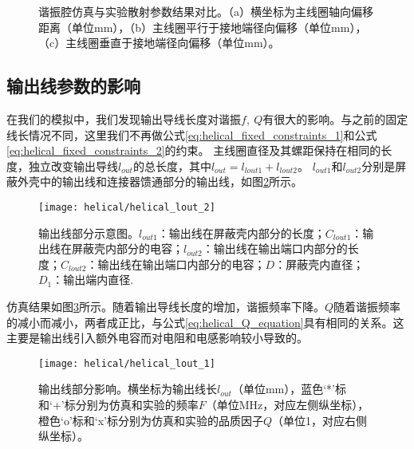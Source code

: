 \begin{figure}
    \centering
    \caption[谐振腔仿真与实验散射参数结果对比]{谐振腔仿真与实验散射参数结果对比。（a）横坐标为主线圈轴向偏移距离（单位mm），（b）主线圈平行于接地端径向偏移（单位mm），（c）主线圈垂直于接地端径向偏移（单位mm）。\label{fig:helical_main_coil_compares}}
\end{figure}


\subsection[输出线参数的影响]{输出线参数的影响\label{section:helical_output_wire}}
在我们的模拟中，我们发现输出导线长度对谐振$f,\ Q$有很大的影响。与之前的固定线长情况不同，这里我们不再做公式\eqref{eq:helical_fixed_constraints_1}和公式\eqref{eq:helical_fixed_constraints_2}的约束。
主线圈直径及其螺距保持在相同的长度，独立改变输出导线$l_{out}$的总长度，其中$l_{out} = l_{lout1} + l_{lout2}$。
$l_{out1}$和$l_{out2}$分别是屏蔽外壳中的输出线和连接器馈通部分的输出线，如图\ref{fig:helical_lout_2}所示。


\begin{figure}
    \centering
    \caption[输出线部分示意图]{输出线部分示意图。$l_{out1}$：输出线在屏蔽壳内部分的长度；$C_{lout1}$：输出线在屏蔽壳内部分的电容；$l_{out2}$：输出线在输出端口内部分的长度；$C_{lout2}$：输出线在输出端口内部分的电容；$D$：屏蔽壳内直径；$D_1$：输出端内直径.\label{fig:helical_lout_2}}
    \texttt{[image: helical/helical\_lout\_2]}
\end{figure}

仿真结果如图\ref{fig:helical_lout_1}所示。随着输出导线长度的增加，谐振频率下降。$Q$随着谐振频率的减小而减小，两者成正比，与公式\eqref{eq:helical_Q_equation}具有相同的关系。这主要是输出线引入额外电容而对电阻和电感影响较小导致的。

\begin{figure}
    \centering
    \caption[输出线部分影响]{输出线部分影响。横坐标为输出线长$l_{out}$（单位mm），蓝色‘*’标和‘+’标分别为仿真和实验的频率$F$（单位MHz，对应左侧纵坐标），橙色‘o’标和‘x’标分别为仿真和实验的品质因子$Q$（单位1，对应右侧纵坐标）。\label{fig:helical_lout_1}}
    \texttt{[image: helical/helical\_lout\_1]}
\end{figure}

